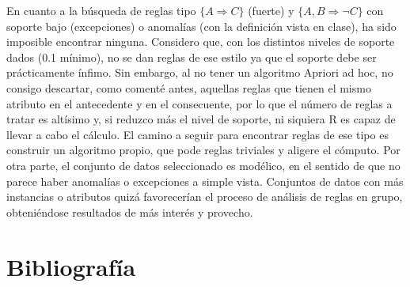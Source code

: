 En cuanto a la búsqueda de reglas tipo $\{A \Rightarrow C \}$ (fuerte) y $\{A,B \Rightarrow \neg C \}$ con soporte bajo (excepciones) o anomalías (con la definición vista en clase), ha sido imposible encontrar ninguna. Considero que, con los distintos niveles de soporte dados (0.1 mínimo), no se dan reglas de ese estilo ya que el soporte debe ser prácticamente ínfimo. Sin embargo, al no tener un algoritmo Apriori ad hoc, no consigo descartar, como comenté antes, aquellas reglas que tienen el mismo atributo en el antecedente y en el consecuente, por lo que el número de reglas a tratar es altísimo y, si reduzco más el nivel de soporte, ni siquiera R es capaz de llevar a cabo el cálculo. El camino a seguir para encontrar reglas de ese tipo es construir un algoritmo propio, que pode reglas triviales y aligere el cómputo. Por otra parte, el conjunto de datos seleccionado es modélico, en el sentido de que no parece haber anomalías o excepciones a simple vista. Conjuntos de datos con más instancias o atributos quizá favorecerían el proceso de análisis de reglas en grupo, obteniéndose resultados de más interés y provecho.

\newpage
\section{Bibliografía}




